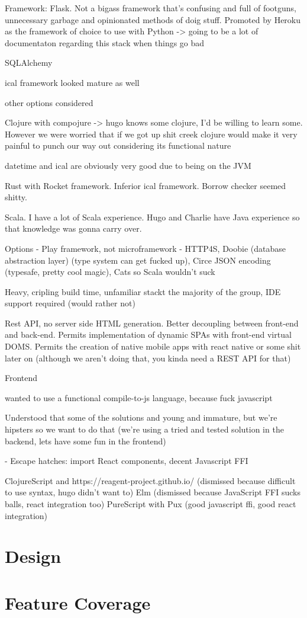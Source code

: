 \documentclass[11pt,a4paper]{report}
\begin{document}
Framework: Flask. Not a bigass framework that's confusing and full of footguns, unnecessary garbage and opinionated methods of doig stuff.
Promoted by Heroku as the framework of choice to use with Python -> going to be a lot of documentaton regarding this stack when things go bad

SQLAlchemy

ical framework looked mature as well

other options considered


Clojure with compojure -> hugo knows some clojure, I'd be willing to learn some. However we were worried that if we got up shit creek clojure would make it very painful to punch our way out considering its functional nature

datetime and ical are obviously very good due to being on the JVM


Rust with Rocket framework. Inferior ical framework. Borrow checker seemed shitty.

Scala. I have a lot of Scala experience. Hugo and Charlie have Java experience so that knowledge was gonna carry over.

Options - Play framework, not microframework
- HTTP4S, Doobie (database abstraction layer) (type system can get fucked up), Circe JSON encoding (typesafe, pretty cool magic), Cats so Scala wouldn't suck

Heavy, cripling build time, unfamiliar stackt the majority of the group, IDE support required (would rather not)




Rest API, no server side HTML generation. Better decoupling between front-end and back-end. Permits implementation of dynamic SPAs with front-end virtual DOMS. Permits the creation of native mobile apps with react native or some shit later on (although we aren't doing that, you kinda need a REST API for that)

Frontend

wanted to use a functional compile-to-js language, because fuck javascript

Understood that some of the solutions and young and immature, but we're hipsters so we want to do that (we're using a tried and tested solution in the backend, lets have some fun in the frontend)

- Escape hatches: import React components, decent Javascript FFI

ClojureScript and https://reagent-project.github.io/ (dismissed because difficult to use syntax, hugo didn't want to)
Elm (dismissed because JavaScript FFI sucks balls, react integration too)
PureScript with Pux (good javascript ffi, good react integration)


\chapter{Design}

\chapter{Feature Coverage}



\end{document}
